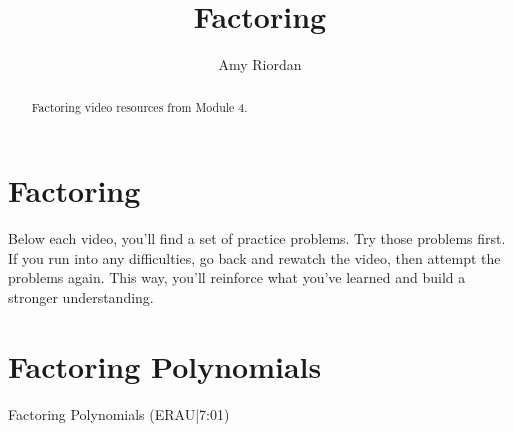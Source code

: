 \documentclass{ximera}
\title{Factoring}
\author{Amy Riordan}
\begin{document}
\begin{abstract}
Factoring video resources from Module 4.
\end{abstract}
\maketitle

\section*{Factoring}

Below each video, you’ll find a set of practice problems. Try those problems first. If you run into any difficulties, go back and rewatch the video, then attempt the problems again. This way, you’ll reinforce what you’ve learned and build a stronger understanding.

\section*{Factoring Polynomials}

Factoring Polynomials (ERAU|7:01)

\end{document}
